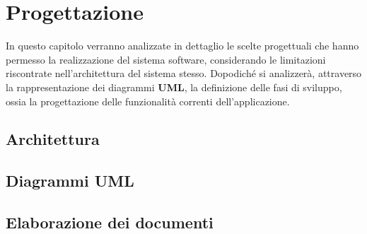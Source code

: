 \def \ti{\textit}
\def \bf{\textbf}

\chapter{Progettazione}
	\label{cap:progettazione}
	
    In questo capitolo verranno analizzate in dettaglio le scelte progettuali che hanno permesso la realizzazione del sistema software, considerando le limitazioni riscontrate nell'architettura del sistema stesso. Dopodiché si analizzerà, attraverso la rappresentazione dei diagrammi \textbf{UML}, la definizione delle fasi di sviluppo, ossia la progettazione delle funzionalità correnti dell'applicazione.

\section{Architettura}
	\label{sec:architettura}
	
\section{Diagrammi UML}
	\label{sec:uml}

\section{Elaborazione dei documenti}
	\label{sec:documenti}